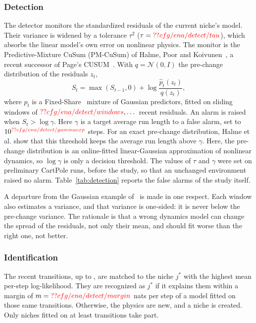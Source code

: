 \subsubsection{Detection}
The detector monitors the standardized residuals of the current niche's model. Their variance is widened by a tolerance $\tau^2$ ($\tau = \Res{cfg/ena/detect/tau}$), which absorbs the linear model's own error on nonlinear physics. The monitor is the Predictive-Mixture CuSum (PM-CuSum) of Halme, Poor and Koivunen~\cite{halme2026sequential}, a recent successor of Page's CUSUM~\cite{page1954continuous}. With $q = \mathcal{N}(0, I)$ the pre-change distribution of the residuals $z_t$,
\begin{equation}
S_t = \max(S_{t-1}, 0) + \log \frac{\hat{p}_t(z_t)}{q(z_t)},
\end{equation}
where $\hat{p}_t$ is a Fixed-Share~\cite{herbster1998tracking} mixture of Gaussian predictors, fitted on sliding windows of $\Res{cfg/ena/detect/windows}, \dots$ recent residuals. An alarm is raised when $S_t > \log\gamma$. Here $\gamma$ is a target average run length to a false alarm, set to $10^{\Res{cfg/ena/detect/gammaexp}}$ steps. For an exact pre-change distribution, Halme et al. show that this threshold keeps the average run length above $\gamma$. Here, the pre-change distribution is an online-fitted linear-Gaussian approximation of nonlinear dynamics, so $\log\gamma$ is only a decision threshold. The values of $\tau$ and $\gamma$ were set on preliminary CartPole runs, before the study, so that an unchanged environment raised no alarm. Table~\ref{tab:detection} reports the false alarms of the study itself.

A departure from the Gaussian example of~\cite{halme2026sequential} is made in one respect. Each window also estimates a variance, and that variance is one-sided: it is never below the pre-change variance. The rationale is that a wrong dynamics model can change the spread of the residuals, not only their mean, and should fit worse than the right one, not better.

\subsubsection{Identification}
The recent transitions, up to , are matched to the niche $j^{*}$ with the highest mean per-step log-likelihood. They are recognized as $j^{*}$ if it explains them within a margin of $m = \Res{cfg/ena/detect/margin}$ nats per step of a model fitted on those same transitions. Otherwise, the physics are new, and a niche is created. Only niches fitted on at least  transitions take part.

